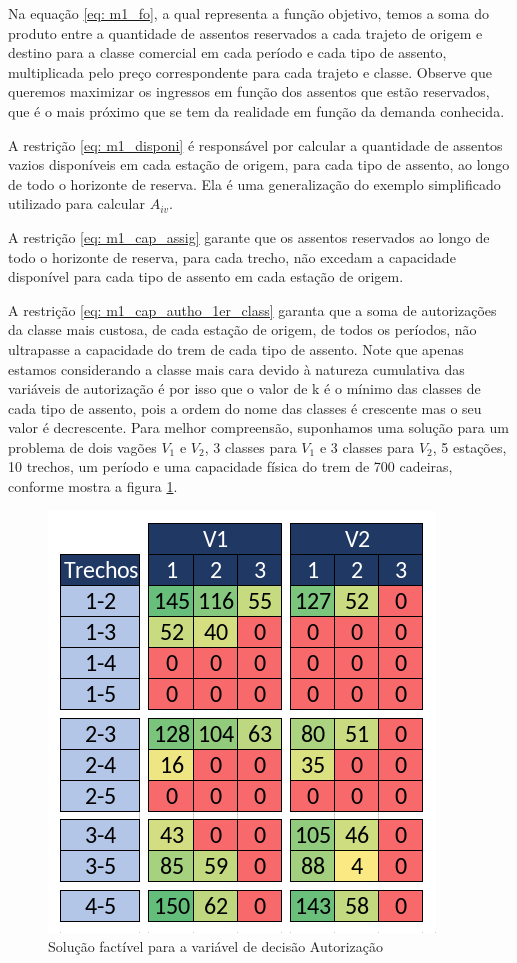 Na equação \ref{eq: m1_fo}, a qual representa a função objetivo, temos a soma do produto entre a quantidade de assentos reservados a cada trajeto de origem e destino para a classe comercial em cada período e cada tipo de assento, multiplicada pelo preço correspondente para cada trajeto e classe. Observe que queremos maximizar os ingressos em função dos assentos que estão reservados, que é o mais próximo que se tem da realidade em função da demanda conhecida.

A restrição \ref{eq: m1_disponi} é responsável por calcular a quantidade de assentos vazios disponíveis em cada estação de origem, para cada tipo de assento, ao longo de todo o horizonte de reserva. Ela é uma generalização do exemplo simplificado utilizado para calcular $A_{iv}$.

A restrição \ref{eq: m1_cap_assig} garante que os assentos reservados ao longo de todo o horizonte de reserva, para cada trecho, não excedam a capacidade disponível para cada tipo de assento em cada estação de origem.

A restrição \ref{eq: m1_cap_autho_1er_class} garanta que a soma de autorizações da classe mais custosa, de cada estação de origem, de todos os períodos, não ultrapasse a capacidade do trem de cada tipo de assento. Note que apenas estamos considerando a classe mais cara devido à natureza cumulativa das variáveis de autorização é por isso que o valor de k é o mínimo das classes de cada tipo de assento, pois a ordem do nome das classes é crescente mas o seu valor é decrescente. Para melhor compreensão, suponhamos uma solução para um problema de dois vagões $V_1$ e $V_2$, 3 classes para $V_1$ e 3 classes para $V_2$, 5 estações,  10 trechos, um período e uma capacidade física do trem de 700 cadeiras, conforme mostra a figura \ref{fig: autorization}.

\begin{figure}[H]
	\begin{center}
		\includegraphics[scale=0.40]{img/exemplo1.png}
		\caption{Solução factível para a variável de decisão Autorização}
		\label{fig: autorization}
	\end{center}
\end{figure}

